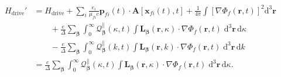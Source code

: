 \documentclass{article}
\begin{document}
\begin{equation}
\begin{split}
H_\mathrm{drive}' &= H_\mathrm{drive} + \sum_i\frac{e_i}{\mu_{fi}c}\mathbf{p}_{fi}(t)\cdot\mathbf{A}[\mathbf{x}_{fi}(t),t] + \frac{1}{4\pi}\int\left[\nabla\Phi_f(\mathbf{r},t)\right]^2\mathrm{d}^3\mathbf{r}\\
&\qquad + \frac{e}{\Delta}\sum_{\bm{\beta}}\int_0^\infty\mathcal{Q}_{\bm{\beta}}^\parallel(\kappa,t)\int\mathbf{L}_{\bm{\beta}}(\mathbf{r},\kappa)\cdot\nabla\Phi_f(\mathbf{r},t)\;\mathrm{d}^3\mathbf{r}\,\mathrm{d}\kappa\\
&\qquad - \frac{e}{\Delta}\sum_{\bm{\beta}}\int_0^\infty\mathcal{Q}_{\bm{\beta}}^\parallel(k,t)\int\mathbf{L}_{\bm{\beta}}(\mathbf{r},k)\cdot\nabla\Phi_f(\mathbf{r},t)\;\mathrm{d}^3\mathbf{r}\,\mathrm{d}k\\
&= \frac{e}{\Delta}\sum_{\bm{\beta}}\int_0^\infty\mathcal{Q}_{\bm{\beta}}^\parallel(\kappa,t)\int\mathbf{L}_{\bm{\beta}}(\mathbf{r},\kappa)\cdot\nabla\Phi_f(\mathbf{r},t)\;\mathrm{d}^3\mathbf{r}\,\mathrm{d}\kappa.
\end{split}
\end{equation}
\end{document}
